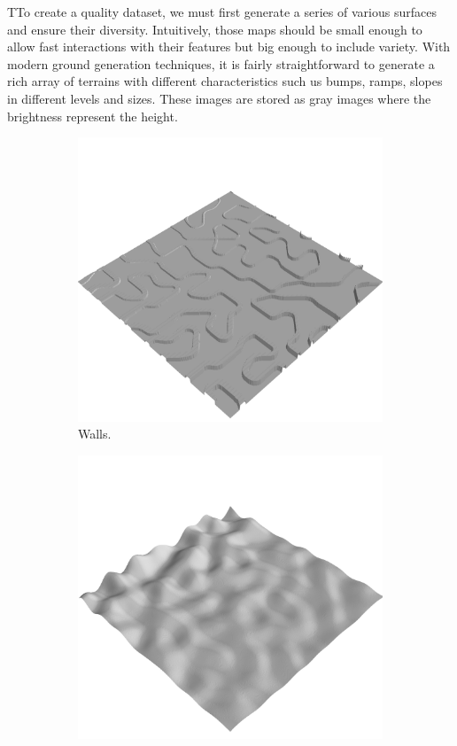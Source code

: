 \documentclass[../document.tex]{subfiles}
\begin{document}
TTo create a quality dataset, we must first generate a series of various surfaces and ensure their diversity. Intuitively, those maps should be small enough to allow fast interactions with their features but big enough to include variety. With modern ground generation techniques, it is fairly straightforward to generate a rich array of terrains with different characteristics such us bumps, ramps, slopes in different levels and sizes. These images are stored as gray images where the brightness represent the height.
\begin{figure}[H]
    \centering
    \begin{subfigure}[b]{0.24\textwidth}
        \includegraphics[width=\linewidth]{../img/hm3d/bars1.png}
        \caption{Walls.}
    \end{subfigure}
    \begin{subfigure}[b]{0.24\textwidth}
        \includegraphics[width=\linewidth]{../img/hm3d/bumps2.png}

\end{subfigure}
\end{figure}
\end{document}
